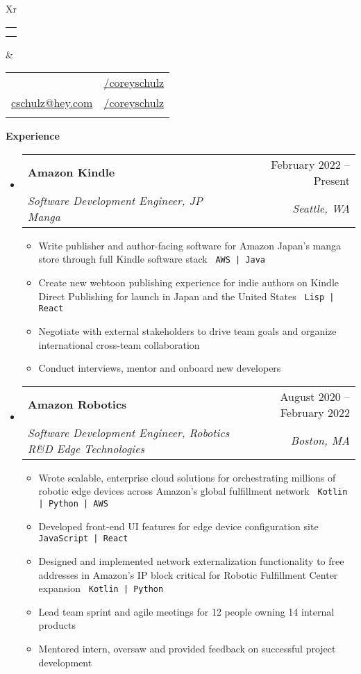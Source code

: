 \documentclass[letterpaper,12pt]{article}[leftmargin=*]
\makeatletter
\def \fullname {Corey Schulz}
\def \subtitle { } %
\def \linkedinicon {\faLinkedin}
\def \linkedinlink {https://linkedin.com/in/coreyschulz/}
\def \linkedintext {/coreyschulz}
\def \phoneicon {\faPhone}
\def \phonetext {801.898.6226}
\def \emailicon {\faEnvelope}
\def \emaillink {mailto:cschulz@hey.com}
\def \emailtext {cschulz@hey.com}
\def \githubicon {\faGithub}
\def \githublink {https://github.com/coreyschulz}
\def \githubtext {/coreyschulz}
\def \psicon {\faPlaystation}
\def \headertype {\doublecol} %
\def \entryspacing {-0pt}
\def \linkedin {\linkedinicon \hspace{3pt}\href{\linkedinlink}{\linkedintext}}
\def \phone {\phoneicon \hspace{3pt}{ \phonetext}}
\def \email {\emailicon \hspace{3pt}\href{\emaillink}{\emailtext}}
\def \github {\githubicon \hspace{3pt}\href{\githublink}{\githubtext}}
\def \website {}
\renewcommand{\section}[2]{\vspace{5pt}
  \colorbox{secondary}{\color{white}\raggedbottom\normalsize\textbf{{#1}{\hspace{7pt}#2}}}
}
\newcommand{\resumeEntryStart}{\begin{itemize}[leftmargin=2.5mm]}
\newcommand{\resumeEntryEnd}{\end{itemize}\vspace{\entryspacing}}
\def\code#1{\texttt{#1}}
\newcommand{\resumeItemListStart}{\begin{itemize}[leftmargin=4.5mm]}
\newcommand{\resumeItemListEnd}{\end{itemize}}
\newcommand{\resumeItem}[1]{
  \item\small{
    {#1 \vspace{-2pt}}
  }
}
\newcommand{\resumeEntryTSDL}[4]{
  \vspace{-1pt}\item[]
    \begin{tabularx}{0.97\textwidth}{X@{\hspace{60pt}}r}
      \textbf{\color{primary}#1} & {\firabook\color{accent}\small#2} \\
      \textit{\color{accent}\small#3} & \textit{\color{accent}\small#4} \\
    \end{tabularx}\vspace{-6pt}
}
\newcommand{\doublecol}[6]{
  \begin{tabularx}{\textwidth}{Xr}
    {
      \begin{tabular}[c]{l}
        \fontsize{35}{45}\selectfont{\color{primary}{{\textbf{\fullname}}}} \\
        {\textit{\subtitle}} %
      \end{tabular}
    } & {
      \begin{tabular}[c]{l@{\hspace{1.5em}}l}
        {\small#4} & {\small#1} \\
        {\small#5} & {\small#2} \\
        {\small#6} & {\small#3}
      \end{tabular}
    }
  \end{tabularx}
}
\newcommand{\singlecol}[6]{
  \begin{tabularx}{\textwidth}{Xr}
    {
      \begin{tabular}[b]{l}
        \fontsize{35}{45}\selectfont{\color{primary}{{\textbf{\fullname}}}} \\
        {\textit{\subtitle}} %
      \end{tabular}
    } & {
      \begin{tabular}[c]{l}
        {\small#1} \\
        {\small#2} \\
        {\small#3} \\
        {\small#4} \\
        {\small#5} \\
        {\small#6}
      \end{tabular}
    }
  \end{tabularx}
}
\makeatother
\begin{document}


\headertype{\linkedin}{\github}{\website}{\phone}{\email}{} %
\vspace{-2pt} %


\section{\faCode}{Experience}


  \resumeEntryStart
    \resumeEntryTSDL
      {\faAmazon \hspace{3pt} Amazon Kindle}{February 2022 -- Present}
      {Software Development Engineer, JP Manga}{Seattle, WA}
    \resumeItemListStart
      \resumeItem {Write publisher and author-facing software for Amazon Japan's manga store through full Kindle software stack \code{ AWS | Java }}
      \resumeItem {Create new webtoon publishing experience for indie authors on Kindle Direct Publishing for launch in Japan and the United States \code{ Lisp | React}}
      \resumeItem {Negotiate with external stakeholders to drive team goals and organize international cross-team collaboration }
      \resumeItem {Conduct interviews, mentor and onboard new developers}
      
    \resumeItemListEnd
  \resumeEntryEnd

  \resumeEntryStart
    \resumeEntryTSDL
      {\faAmazon \hspace{3pt} Amazon Robotics}{August 2020 -- February 2022}
      {Software Development Engineer, Robotics R\&D Edge Technologies}{Boston, MA}
    \resumeItemListStart
      \resumeItem {Wrote scalable, enterprise cloud solutions for orchestrating millions of robotic edge devices across Amazon's global fulfillment network \code{ Kotlin | Python | AWS}}
      \resumeItem {Developed front-end UI features for edge device configuration site  \code{ JavaScript | React}}
      \resumeItem {Designed and implemented network externalization functionality to free addresses in Amazon's IP block critical for Robotic Fulfillment Center expansion \code{ Kotlin | Python}}
      \resumeItem {Lead team sprint and agile meetings for 12 people owning 14 internal products}
      \resumeItem {Mentored intern, oversaw and provided feedback on successful project development}      
    \resumeItemListEnd
  \resumeEntryEnd
\end{document}
